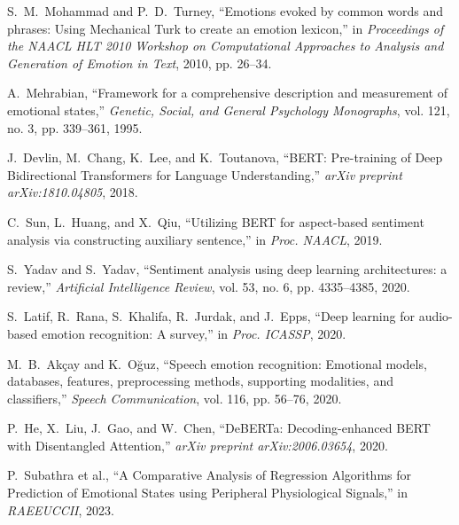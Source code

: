 \documentclass[conference]{IEEEtran}
\begin{document}
\begin{thebibliography}{00}

S.~M.~Mohammad and P.~D.~Turney,
``Emotions evoked by common words and phrases: Using Mechanical Turk to create an emotion lexicon,''
in \emph{Proceedings of the NAACL HLT 2010 Workshop on Computational Approaches to Analysis and Generation of Emotion in Text}, 2010, pp. 26--34.

A.~Mehrabian,
``Framework for a comprehensive description and measurement of emotional states,''
\emph{Genetic, Social, and General Psychology Monographs}, vol. 121, no. 3, pp. 339--361, 1995.

J.~Devlin, M.~Chang, K.~Lee, and K.~Toutanova,
``BERT: Pre-training of Deep Bidirectional Transformers for Language Understanding,''
\emph{arXiv preprint arXiv:1810.04805}, 2018.

C.~Sun, L.~Huang, and X.~Qiu,
``Utilizing BERT for aspect-based sentiment analysis via constructing auxiliary sentence,''
in \emph{Proc. NAACL}, 2019.

S.~Yadav and S.~Yadav,
``Sentiment analysis using deep learning architectures: a review,''
\emph{Artificial Intelligence Review}, vol. 53, no. 6, pp. 4335--4385, 2020.

S.~Latif, R.~Rana, S.~Khalifa, R.~Jurdak, and J.~Epps,
``Deep learning for audio-based emotion recognition: A survey,''
in \emph{Proc. ICASSP}, 2020.

M.~B.~Akçay and K.~Oğuz,
``Speech emotion recognition: Emotional models, databases, features, preprocessing methods, supporting modalities, and classifiers,''
\emph{Speech Communication}, vol. 116, pp. 56--76, 2020.

P.~He, X.~Liu, J.~Gao, and W.~Chen,
``DeBERTa: Decoding-enhanced BERT with Disentangled Attention,''
\emph{arXiv preprint arXiv:2006.03654}, 2020.

P.~Subathra et al.,
``A Comparative Analysis of Regression Algorithms for Prediction of Emotional States using Peripheral Physiological Signals,''
in \emph{RAEEUCCII}, 2023.


\end{thebibliography}
\end{document}
